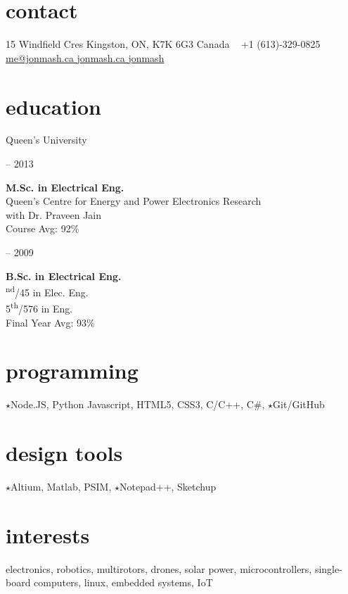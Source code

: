 
\begin{aside}
%
\section{contact}
15 Windfield Cres
Kingston, ON, K7K 6G3
Canada
~
+1 (613)-329-0825
~
\href{mailto:me@jonmash.ca}{me@jonmash.ca \faEnvelope}
\href{http://www.jonmash.ca}{jonmash.ca \faLink}
\href{https://github.com/jonmash}{jonmash \faGithub}
%
\section{education}
\restorecr
{\headingfont Queen's University}
\begin{center}
{ -- 2013} \\
\end{center}
\textbf{M.Sc. {\normalfont in Electrical Eng.}}\\
{\bodyfontit Queen’s Centre for Energy and Power Electronics Research}\\
with Dr. Praveen Jain\\
Course Avg: 92\%\\
\vspace{0.3cm}
\begin{center}
{ -- 2009} \\
\end{center}
\textbf{B.Sc. {\normalfont in Electrical Eng.}}\\
{\textsuperscript{nd}/45 in Elec. Eng. \\ 5\textsuperscript{th}/576 in Eng.}\\
Final Year Avg: 93\%\\
%
\section{programming}
{\color{orange} $\star$}Node.JS, Python
Javascript, HTML5, CSS3, C/C++, C\#,
{\color{orange} $\star$}Git/GitHub
%
\section{design tools}
{\color{orange} $\star$}Altium, Matlab, PSIM, {\color{orange} $\star$}Notepad++, Sketchup
%
\section{interests}
electronics, robotics, multirotors, drones, solar power, microcontrollers, single-board computers, linux, embedded systems, IoT
\obeycr
\end{aside}